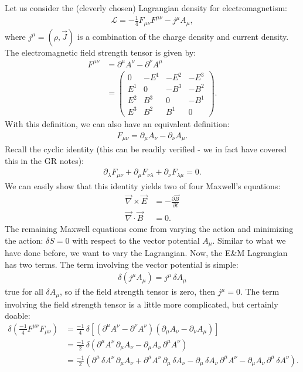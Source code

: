 \documentclass[a4paper,11pt]{article}
\numberwithin{equation}{section}
\theoremstyle{definition}
\begin{document}
Let us consider the (cleverly chosen) Lagrangian density for electromagnetism:
\begin{align*}
\mathcal{L} = -\frac{1}{4}F_{\mu\nu}F^{\mu\nu} - j^\mu A_\mu,
\end{align*}
where $j^\mu = (\rho, \vec{J})$ is a combination of the charge density and current density. The electromagnetic field strength tensor is given by:
\begin{align*}
F^{\mu\nu} &= \partial^\mu A^\nu - \partial^\nu A^\mu \\
&= \begin{pmatrix}
0 & -E^1 & -E^2 & -E^3\\
E^1 & 0 & -B^3 & -B^2 \\
E^2 & B^3 & 0 & -B^1\\
E^3 & B^2 & B^1 & 0
\end{pmatrix}.
\end{align*}
With this definition, we can also have an equivalent definition:
\begin{align*}
F_{\mu\nu} = \partial_\mu A_\nu - \partial_\nu A_\mu.
\end{align*}
Recall the cyclic identity (this can be readily verified - we in fact have covered this in the GR notes):
\begin{align*}
\partial_\lambda F_{\mu\nu} + \partial_{\mu}F_{\nu\lambda} + \partial_{\nu}F_{\lambda\mu} = 0.
\end{align*}
We can easily show that this identity yields two of four Maxwell's equations:
\begin{align*}
\vec{\nabla}\times\vec{E} &= -\frac{\partial \vec{B}}{\partial t}\\
\vec{\nabla}\cdot\vec{B} &= 0.
\end{align*}
The remaining Maxwell equations come from varying the action and minimizing the action: $\delta S = 0$ with respect to the vector potential $A_\mu$. Similar to what we have done before, we want to vary the Lagrangian. Now, the E\&M Lagrangian has two terms. The term involving the vector potential is simple:
\begin{align*}
\delta \left( j^\mu A_\mu \right) = j^\mu\,\delta A_\mu 
\end{align*}
true for all $\delta A_\mu$, so if the field strength tensor is zero, then $j^\mu = 0$. The term involving the field strength tensor is a little more complicated, but certainly doable:
\begin{align*}
\delta\left( \frac{-1}{4}F^{\mu\nu}F_{\mu\nu} \right) 
&= \frac{-1}{4}\,\delta\left[\left( \partial^\mu A^\nu - \partial^\nu A^\nu  \right)\left( \partial_\mu A_\nu - \partial_\nu A_\mu \right)\right]\\
&= \frac{-1}{2}\,\delta\left( \partial^\mu A^\nu\,\partial_\mu A_\nu - \partial_\mu A_\nu\,\partial^\mu A^\nu\right)\\
&= \frac{-1}{2}\left( \partial^\mu\,\delta A^\nu\,\partial_\mu A_\nu  + 
\partial^\mu A^\nu\,\partial_\mu\,\delta A_\nu - \partial_\mu \,\delta A_\nu\,\partial^\mu A^\nu - \partial_\mu A_\nu\,\partial^\mu \,\delta A^\nu \right).
\end{align*}
\end{document}
